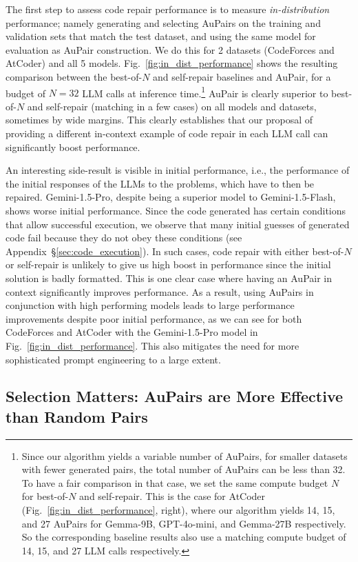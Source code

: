 \documentclass[11pt, a4paper, logo, copyright]{googledeepmind}
\def\aupair/{\textcolor{golden}{Au}Pair}
\def\aupairs/{\textcolor{golden}{Au}Pairs}
\begin{document}
The first step to assess code repair performance is to measure
\emph{in-distribution} performance; namely generating and selecting \aupairs/ on the training and validation sets that match the test dataset, and using the same model for evaluation as \aupair/ construction. We do this for 2 datasets (CodeForces and AtCoder) and all 5 models. Fig.~\ref{fig:in_dist_performance} shows the resulting comparison between the best-of-$N$ and self-repair baselines and \aupair/, for a budget of $N = 32$ LLM calls at inference time.\footnote{Since our algorithm yields a variable number of \aupairs/, for smaller datasets with fewer generated pairs, the total number of \aupairs/ can be less than 32. To have a fair comparison in that case, we set the same compute budget $N$ for best-of-$N$ and self-repair. This is the case for AtCoder (Fig.~\ref{fig:in_dist_performance}, right), where our algorithm yields 14, 15, and 27 \aupairs/ for Gemma-9B, GPT-4o-mini, and Gemma-27B respectively. So the corresponding baseline results also use a matching compute budget of 14, 15, and 27 LLM calls respectively.} \aupair/ is clearly superior to best-of-$N$ and self-repair (matching in a few cases) on all models and datasets, sometimes by wide margins. This clearly establishes that our proposal of providing a different in-context example of code repair in each LLM call can significantly boost performance.

An interesting side-result is visible in initial performance, i.e., the performance of the initial responses of the LLMs to the problems, which have to then be repaired. Gemini-1.5-Pro, despite being a superior model to Gemini-1.5-Flash, shows worse initial performance. Since the code generated has certain conditions that allow successful execution, we observe that many initial guesses of generated code fail because they do not obey these conditions (see Appendix~\S\ref{sec:code_execution}). In such cases, code repair with either best-of-$N$ or self-repair is unlikely to give us high boost in performance since the initial solution is badly formatted. This is one clear case where having an \aupair/ in context significantly improves performance. As a result, using \aupairs/ in conjunction with high performing models leads to large performance improvements despite poor initial performance, as we can see for both CodeForces and AtCoder with the Gemini-1.5-Pro model in Fig.~\ref{fig:in_dist_performance}. This also mitigates the need for more sophisticated prompt engineering to a large extent. 


\subsection{Selection Matters: \aupairs/ are More Effective than Random Pairs}
\label{sec:pairs_vs_aupairs}
\end{document}
